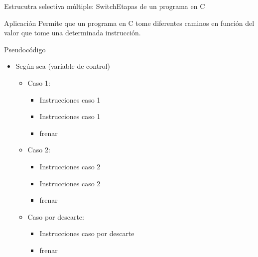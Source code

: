 \documentclass[xcolor=pdftex,table,11pt]{beamer}
\begin{document}
\begin{frame}{Estrucutra selectiva múltiple: Switch}Etapas de un programa en C

 \begin{block}{Aplicación}
 Permite que un programa en C tome diferentes caminos en función del valor que tome una determinada instrucción.
 
 
 \end{block}

 \begin{block}{Pseudocódigo}

    \begin{itemize}
   \item[]Según sea (variable de control)
   \begin{itemize}

     	\item[] Caso 1:
     	    \begin{itemize}
     			\item[] Instrucciones caso 1
     			\item[] Instrucciones caso 1
     			\item[] frenar
     		   \end{itemize}

        \item[] Caso 2:
     	    \begin{itemize}
     			\item[] Instrucciones caso 2
     			\item[] Instrucciones caso 2

     			\item[] frenar
 		
   			\end{itemize}
    
    \item[] Caso por descarte:
     	    \begin{itemize}
     			\item[] Instrucciones caso por descarte
     			\item[] frenar
 		
   			\end{itemize}

   \end{itemize}

	\end{itemize}

 \end{block}





\end{frame}
\end{document}
